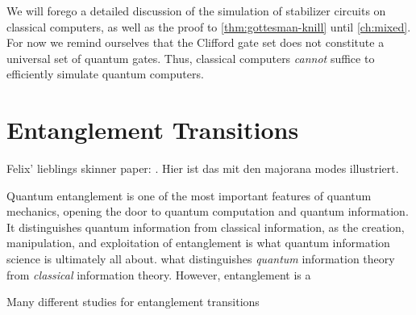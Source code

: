 We will forego a detailed discussion of the simulation of stabilizer circuits
on classical computers, as well as the proof to \cref{thm:gottesman-knill}
until \cref{ch:mixed}. For now we remind ourselves that the Clifford gate set
does not constitute a universal set of quantum gates. Thus, classical computers
\emph{cannot} suffice to efficiently simulate quantum computers.
\clearpage
\section{Entanglement Transitions}\label{sec:ent-trans}

Felix' lieblings skinner paper:
\cite{nahumEntanglementDynamicsDiffusionannihilation2020}. Hier ist das mit den
majorana modes illustriert.

%

Quantum entanglement is one of the most important features of quantum
mechanics, opening the door to quantum computation and quantum information. It
distinguishes quantum information from classical information, as the creation,
manipulation, and exploitation of entanglement is what quantum information
science is ultimately all about. 
what distinguishes \emph{quantum} information
theory from \emph{classical} information theory. However, entanglement is a 

Many different studies for entanglement transitions
\cite{liMeasurementdrivenEntanglementTransition2019,baoTheoryPhaseTransition2020,baoSymmetryEnrichedPhases2021,schmolkeMeasurementinducedQuantumSynchronization2023,hokeMeasurementinducedEntanglementTeleportation2023,skinnerMeasurementInducedPhaseTransitions2019,nahumMeasurementEntanglementPhase2021,nahumEntanglementDynamicsDiffusionannihilation2020,yoshidaDecodingEntanglementStructure2021}

